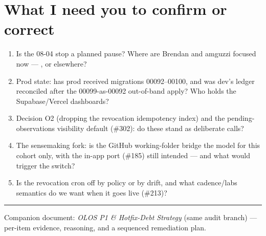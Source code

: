 \documentclass[10pt]{article}
\newcommand{\gh}[1]{\mbox{\##1}}
\begin{document}
\section{What I need you to confirm or correct}
\begin{enumerate}
  \item Is the 08-04 stop a planned pause? Where are Brendan and amguzzi focused now --- , or elsewhere?
  \item Prod state: has prod received migrations 00092--00100, and was dev's ledger reconciled after the 00099-as-00092 out-of-band apply? Who holds the Supabase/Vercel dashboards?
  \item Decision O2 (dropping the revocation idempotency index) and the pending-observations visibility default (\gh{302}): do these stand as deliberate calls?
  \item The sensemaking fork: is the GitHub working-folder bridge the model for this cohort only, with the in-app port (\gh{185}) still intended --- and what would trigger the switch?
  \item Is the revocation cron off by policy or by drift, and what cadence/labs semantics do we want when it goes live (\gh{213})?
\end{enumerate}

\vspace{4pt}\hrule\vspace{3pt}
{\footnotesize Companion document: \emph{OLOS P1 \& Hotfix-Debt Strategy} (same audit branch) --- per-item evidence, reasoning, and a sequenced remediation plan.}
\end{document}
